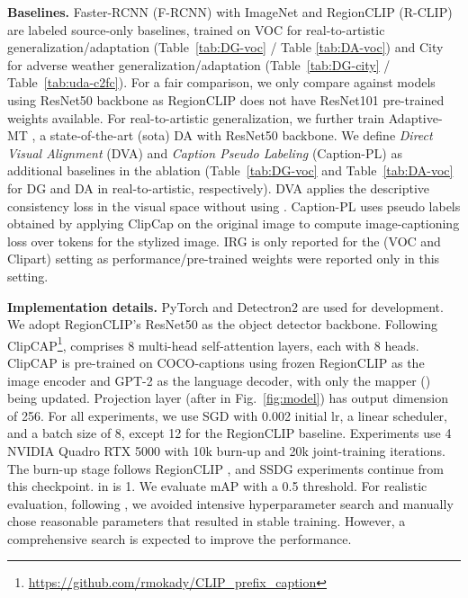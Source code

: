 \textbf{Baselines.}
\label{sec:baselines}
Faster-RCNN \cite{ren2015faster} (F-RCNN) with ImageNet \cite{deng2009imagenet} and RegionCLIP (R-CLIP) are labeled source-only baselines, trained on VOC for real-to-artistic generalization/adaptation (Table~\ref{tab:DG-voc} / Table \ref{tab:DA-voc}) and City for adverse weather generalization/adaptation (Table~\ref{tab:DG-city} / Table~\ref{tab:uda-c2fc}). For a fair comparison, we only compare against models using ResNet50 backbone as RegionCLIP \cite{zhong2022regionclip} does not have ResNet101 pre-trained weights available. For real-to-artistic generalization, we further train Adaptive-MT
\cite{li2022cross}, a state-of-the-art (sota) DA with ResNet50 backbone. We define \textit{Direct Visual Alignment} (DVA) and \textit{Caption Pseudo Labeling} (Caption-PL) as additional baselines in the ablation (Table~\ref{tab:DG-voc} and Table~\ref{tab:DA-voc} for DG and DA in real-to-artistic, respectively). DVA applies the descriptive consistency loss in the visual space without using . Caption-PL uses pseudo labels obtained by applying ClipCap on the original image to compute image-captioning loss over tokens for the stylized image. IRG \cite{vs2022instance} is only reported for the (VOC and Clipart) setting 
as performance/pre-trained weights were reported only in this setting. 


\textbf{Implementation details.} PyTorch \cite{NEURIPS2019_9015} and Detectron2 \cite{wu2019detectron2} are used for development. We adopt RegionCLIP's ResNet50 \cite{he2016deep} as the object detector backbone. Following ClipCAP\footnote{\url{https://github.com/rmokady/CLIP_prefix_caption}},  comprises 8 multi-head self-attention layers, each with 8 heads. ClipCAP is pre-trained on COCO-captions \cite{chen2015microsoft,lin2014microsoft} using frozen RegionCLIP as the image encoder and GPT-2 as the language decoder, with only the mapper () being updated. Projection layer  (after  in Fig.~\ref{fig:model}) has output dimension of 256. For all experiments, we use SGD with 0.002 initial lr, a linear scheduler, and a batch size of 8, except 12 for the RegionCLIP baseline. Experiments use 4 NVIDIA Quadro RTX 5000 with 10k burn-up and 20k joint-training iterations. The burn-up stage follows RegionCLIP \cite{zhong2022regionclip}, and SSDG experiments continue from this checkpoint.  in  is 1. We evaluate mAP with a 0.5 threshold. For realistic evaluation, following \cite{cct,oliver2018realistic}, we avoided intensive hyperparameter search and manually chose reasonable parameters that resulted in stable training. However, a comprehensive search is expected to improve the performance.
